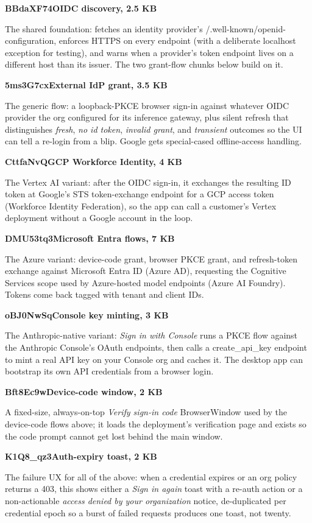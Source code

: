 \documentclass[11pt]{article}
\newcommand{\mono}{\ttfamily}
\newcommand{\reppar}[1]{{\fontsize{10.5}{15.2}\selectfont #1\par}\vspace{8pt}}
\newcommand{\code}[1]{{\mono\small #1}}
\newcommand{\chunkhead}[2]{%
  \vspace{4pt}%
  {\fontsize{10.5}{15.2}\selectfont
   {\mono\bfseries\color{accentink}#1}\;\textbullet\;\textbf{#2}\par}
  \vspace{2pt}}
\begin{document}
\chunkhead{BBdaXF74}{OIDC discovery, 2.5 KB}
\reppar{The shared foundation: fetches an identity provider's \code{/.well-known/openid-configuration}, enforces HTTPS on every endpoint (with a deliberate localhost exception for testing), and warns when a provider's token endpoint lives on a different host than its issuer. The two grant-flow chunks below build on it.}

\chunkhead{5ms3G7cx}{External IdP grant, 3.5 KB}
\reppar{The generic flow: a loopback-PKCE browser sign-in against whatever OIDC provider the org configured for its inference gateway, plus silent refresh that distinguishes \textit{fresh}, \textit{no id token}, \textit{invalid grant}, and \textit{transient} outcomes so the UI can tell a re-login from a blip. Google gets special-cased offline-access handling.}

\chunkhead{CttfaNvQ}{GCP Workforce Identity, 4 KB}
\reppar{The Vertex AI variant: after the OIDC sign-in, it exchanges the resulting ID token at Google's STS token-exchange endpoint for a GCP access token (Workforce Identity Federation), so the app can call a customer's Vertex deployment without a Google account in the loop.}

\chunkhead{DMU53tq3}{Microsoft Entra flows, 7 KB}
\reppar{The Azure variant: device-code grant, browser PKCE grant, and refresh-token exchange against Microsoft Entra ID (Azure AD), requesting the Cognitive Services scope used by Azure-hosted model endpoints (Azure AI Foundry). Tokens come back tagged with tenant and client IDs.}

\chunkhead{oBJ0NwSq}{Console key minting, 3 KB}
\reppar{The Anthropic-native variant: \textit{Sign in with Console} runs a PKCE flow against the Anthropic Console's OAuth endpoints, then calls a \code{create\_api\_key} endpoint to mint a real API key on your Console org and caches it. The desktop app can bootstrap its own API credentials from a browser login.}

\chunkhead{Bft8Ec9w}{Device-code window, 2 KB}
\reppar{A fixed-size, always-on-top \textit{Verify sign-in code} BrowserWindow used by the device-code flows above; it loads the deployment's verification page and exists so the code prompt cannot get lost behind the main window.}

\chunkhead{K1Q8\_qz3}{Auth-expiry toast, 2 KB}
\reppar{The failure UX for all of the above: when a credential expires or an org policy returns a 403, this shows either a \textit{Sign in again} toast with a re-auth action or a non-actionable \textit{access denied by your organization} notice, de-duplicated per credential epoch so a burst of failed requests produces one toast, not twenty.}
\end{document}

